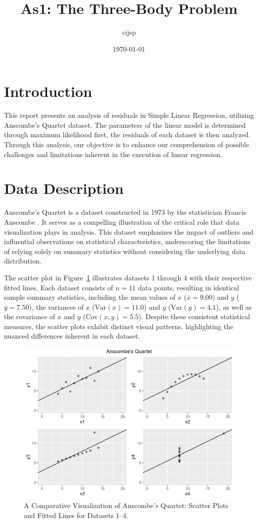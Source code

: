 \documentclass[12pt]{article}
\title{As1: The Three-Body Problem}
\author{cijsp}
\date{\today}
\begin{document}
	
	\maketitle
	
	\section{Introduction}

This report presents an analysis of residuals in Simple Linear Regression, utilizing Anscombe's Quartet dataset. The parameters of the linear model is determined through maximum likelihood first, the residuals of each dataset is then analyzed. Through this analysis, our objective is to enhance our comprehension of possible challenges and limitations inherent in the execution of linear regression.
	
	\section{Data Description}
	
Anscombe's Quartet is a dataset constructed in 1973 by the statistician Francis Anscombe \citep{Anscombe1973}. It serves as a compelling illustration of the critical role that data visualization plays in analysis. This dataset emphasizes the impact of outliers and influential observations on statistical characteristics, underscoring the limitations of relying solely on summary statistics without considering the underlying data distribution.

The scatter plot in Figure~\ref{Fig:anscombe} illustrates datasets 1 through 4 with their respective fitted lines. Each dataset consists of $n=11$ data points, resulting in identical sample summary statistics, including the mean values of $x$ ($\overline{x} = 9.00$) and $y$ ($\overline{y} = 7.50$), the variances of $x$ ($\text{Var}(x) = 11.0$) and $y$ ($\text{Var}(y) = 4.1$), as well as the covariance of $x$ and $y$ ($\text{Cov}\left(x,y\right)=5.5$). Despite these consistent statistical measures, the scatter plots exhibit distinct visual patterns, highlighting the nuanced differences inherent in each dataset.

\begin{figure}[htbp]
\includegraphics[width=.7\textwidth]{anscombe.png}
\centering
\caption{A Comparative Visualization of Anscombe's Quartet: Scatter Plots and Fitted Lines for Datasets 1--4.}
\label{Fig:anscombe}
\end{figure}
\end{document}
